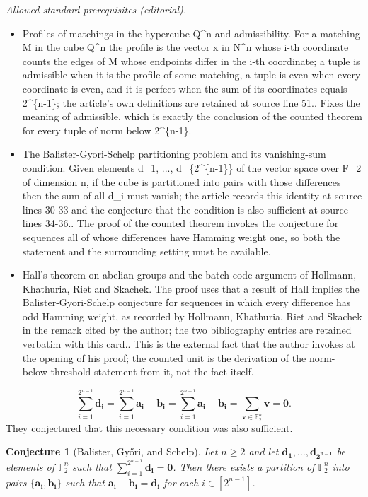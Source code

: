 \documentclass{article}
\newtheorem{conjecture}[theorem]{Conjecture}
\begin{document}
\noindent\textit{Allowed standard prerequisites (editorial).}\begin{itemize}
\item Profiles of matchings in the hypercube Q\textasciicircum{}n and admissibility. For a matching M in the cube Q\textasciicircum{}n the profile is the vector x in N\textasciicircum{}n whose i-th coordinate counts the edges of M whose endpoints differ in the i-th coordinate; a tuple is admissible when it is the profile of some matching, a tuple is even when every coordinate is even, and it is perfect when the sum of its coordinates equals 2\textasciicircum{}\{n-1\}; the article's own definitions are retained at source line 51.. Fixes the meaning of admissible, which is exactly the conclusion of the counted theorem for every tuple of norm below 2\textasciicircum{}\{n-1\}.
\item The Balister-Gyori-Schelp partitioning problem and its vanishing-sum condition. Given elements d\_1, ..., d\_\{2\textasciicircum{}\{n-1\}\} of the vector space over F\_2 of dimension n, if the cube is partitioned into pairs with those differences then the sum of all d\_i must vanish; the article records this identity at source lines 30-33 and the conjecture that the condition is also sufficient at source lines 34-36.. The proof of the counted theorem invokes the conjecture for sequences all of whose differences have Hamming weight one, so both the statement and the surrounding setting must be available.
\item Hall's theorem on abelian groups and the batch-code argument of Hollmann, Khathuria, Riet and Skachek. The proof uses that a result of Hall implies the Balister-Gyori-Schelp conjecture for sequences in which every difference has odd Hamming weight, as recorded by Hollmann, Khathuria, Riet and Skachek in the remark cited by the author; the two bibliography entries are retained verbatim with this card.. This is the external fact that the author invokes at the opening of his proof; the counted unit is the derivation of the norm-below-threshold statement from it, not the fact itself.
\end{itemize}\medskip
\begin{equation}\label{e:null}
\sum_{i=1}^{2^{n-1}} \bm{d_i} = \sum_{i=1}^{2^{n-1}}  \bm{a_i} - \bm{b_i} =   \sum_{i=1}^{2^{n-1}}  \bm{a_i} + \bm{b_i} = \sum_{\bm{v} \in \mathbb{F}_2^n} \bm{v} = \bm{0}.
\end{equation}
They conjectured that this necessary condition was also sufficient.
\begin{conjecture}[Balister, Gy{\H{o}}ri, and Schelp]\label{c:BGS}
Let $n \geq 2$ and let $\bm{d_1},\ldots, \bm{d_{2^{n-1}}}$ be elements of $\mathbb{F}_2^n$ such that $\sum_{i=1}^{2^{n-1}} \bm{d_i} = \bm{0}$. Then there exists a partition of $\mathbb{F}_2^n$ into pairs $\{\bm{a_i},\bm{b_i}\}$ such that $\bm{a_i} - \bm{b_i} = \bm{d_i}$ for each $i \in \left[2^{n-1}\right]$.
\end{conjecture}
\end{document}
